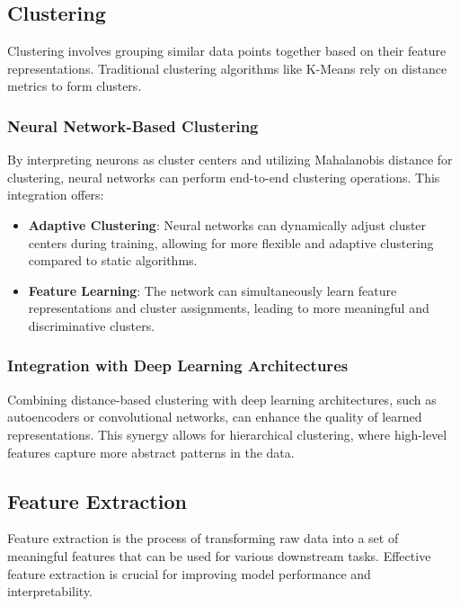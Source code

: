 \subsection{Clustering}
\label{subsec:clustering}

Clustering involves grouping similar data points together based on their feature representations. Traditional clustering algorithms like K-Means rely on distance metrics to form clusters.

\subsubsection{Neural Network-Based Clustering}
By interpreting neurons as cluster centers and utilizing Mahalanobis distance for clustering, neural networks can perform end-to-end clustering operations. This integration offers:
\begin{itemize}
    \item \textbf{Adaptive Clustering}: Neural networks can dynamically adjust cluster centers during training, allowing for more flexible and adaptive clustering compared to static algorithms.
    \item \textbf{Feature Learning}: The network can simultaneously learn feature representations and cluster assignments, leading to more meaningful and discriminative clusters.
\end{itemize}

\subsubsection{Integration with Deep Learning Architectures}
Combining distance-based clustering with deep learning architectures, such as autoencoders or convolutional networks, can enhance the quality of learned representations. This synergy allows for hierarchical clustering, where high-level features capture more abstract patterns in the data.

\subsection{Feature Extraction}
\label{subsec:feature_extraction}

Feature extraction is the process of transforming raw data into a set of meaningful features that can be used for various downstream tasks. Effective feature extraction is crucial for improving model performance and interpretability.

